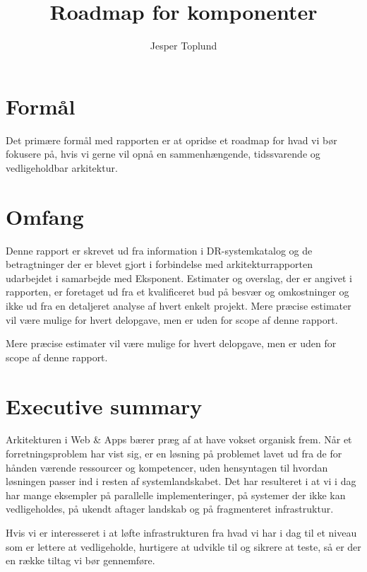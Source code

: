 \documentclass{article}
\author {Jesper Toplund}
\title{Roadmap for komponenter}
\date{}
\begin{document}
\maketitle

\tableofcontents

\newpage

\section{Formål}
Det primære formål med rapporten er at opridse et roadmap for hvad vi bør fokusere på, hvis vi gerne vil opnå en sammenhængende, tidssvarende og vedligeholdbar arkitektur.

\section{Omfang}
Denne rapport er skrevet ud fra information i DR-systemkatalog og de betragtninger der er blevet gjort i forbindelse med arkitekturrapporten udarbejdet i samarbejde med Eksponent. Estimater og overslag, der er angivet i rapporten, er foretaget ud fra et kvalificeret bud på besvær og omkostninger og ikke ud fra en detaljeret analyse af hvert enkelt projekt. Mere præcise estimater vil være mulige for hvert delopgave, men er uden for scope af denne rapport.
 
Mere præcise estimater vil være mulige for hvert delopgave, men er uden for scope af denne rapport.

\section{Executive summary}
Arkitekturen i Web \& Apps bærer præg af at have vokset organisk frem. Når et forretningsproblem har vist sig, er en løsning på problemet lavet ud fra de for hånden værende ressourcer og kompetencer, uden hensyntagen til hvordan løsningen passer ind i resten af systemlandskabet. Det har resulteret i at vi i dag har mange eksempler på parallelle implementeringer, på systemer der ikke kan vedligeholdes, på ukendt aftager landskab og på fragmenteret infrastruktur.

Hvis vi er interesseret i at løfte infrastrukturen fra hvad vi har i dag til et niveau som er lettere at vedligeholde, hurtigere at udvikle til og sikrere at teste, så er der en række tiltag vi bør gennemføre.
\end{document}
